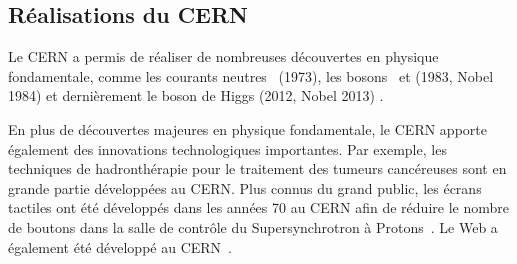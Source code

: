 \subsection{Réalisations du CERN}
Le CERN a permis de réaliser de nombreuses découvertes en physique fondamentale, comme
les courants neutres~\cite{Hasert:243640,HASERT1973138,Hasert:203096} (1973),
les bosons \Wboson\ et \Zboson (1983, Nobel 1984) \cite{Wboson_discovery1,Wboson_discovery2,Wboson_discovery3,Zboson_discovery1,Zboson_discovery2}
et dernièrement le boson de Higgs (2012, Nobel 2013) \cite{ATLAS_Higgs_discovery,CMS_Higgs_discovery}.
\par En plus de découvertes majeures en physique fondamentale, le CERN apporte également des innovations technologiques importantes.
Par exemple, les techniques de hadronthérapie pour le traitement des tumeurs cancéreuses sont en grande partie développées au CERN.
Plus connus du grand public, les écrans tactiles ont été développés dans les années 70 au CERN afin de réduire le nombre de boutons dans la salle de contrôle du Supersynchrotron à Protons~\cite{CERN_touchscreen}.
Le Web a également été développé au CERN~\cite{CERN_web}.

